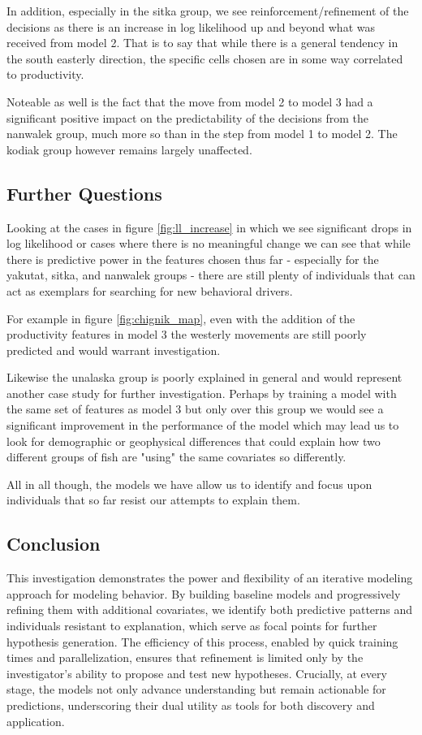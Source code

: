 \documentclass[11pt]{article}
\begin{document}
In addition, especially in the sitka group, we see reinforcement/refinement of the decisions as there is an increase in log likelihood up and beyond what was received from model 2. That is to say that while there is a general tendency in the south easterly direction, the specific cells chosen are in some way correlated to productivity. 

Noteable as well is the fact that the move from model 2 to model 3 had a significant positive impact on the predictability of the decisions from the nanwalek group, much more so than in the step from model 1 to model 2. The kodiak group however remains largely unaffected. 

\subsection*{Further Questions}

Looking at the cases in figure \ref{fig:ll_increase} in which we see significant drops in log likelihood or cases where there is no meaningful change we can see that while there is predictive power in the features chosen thus far - especially for the yakutat, sitka, and nanwalek groups - there are still plenty of individuals that can act as exemplars for searching for new behavioral drivers. 

For example in figure \ref{fig:chignik_map}, even with the addition of the productivity features in model 3 the westerly movements are still poorly predicted and would warrant investigation. 

Likewise the unalaska group is poorly explained in general and would represent another case study for further investigation. Perhaps by training a model with the same set of features as model 3 but only over this group we would see a significant improvement in the performance of the model which may lead us to look for demographic or geophysical differences that could explain how two different groups of fish are "using" the same covariates so differently. 

All in all though, the models we have allow us to identify and focus upon individuals that so far resist our attempts to explain them. 

\subsection*{Conclusion}

This investigation demonstrates the power and flexibility of an iterative modeling approach for modeling behavior. By building baseline models and progressively refining them with additional covariates, we identify both predictive patterns and individuals resistant to explanation, which serve as focal points for further hypothesis generation. The efficiency of this process, enabled by quick training times and parallelization, ensures that refinement is limited only by the investigator's ability to propose and test new hypotheses. Crucially, at every stage, the models not only advance understanding but remain actionable for predictions, underscoring their dual utility as tools for both discovery and application. 
\end{document}
